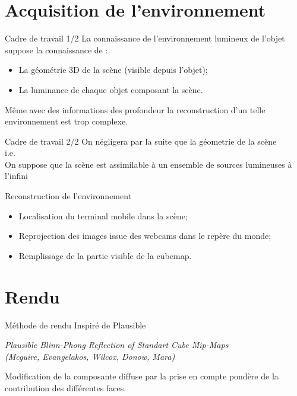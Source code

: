 \documentclass{beamer}
\begin{document}
\section{Acquisition de l'environnement}
\begin{frame}{Cadre de travail 1/2}
	La connaissance de l'environnement lumineux de l'objet suppose la connaissance de :
	\begin{itemize}
		\item La géométrie 3D de la scène (visible depuis l'objet);
		\item La luminance de chaque objet composant la scène.
	\end{itemize}
	Même avec des informations des profondeur la reconstruction d'un telle environnement est trop complexe.		
\end{frame}
\begin{frame}{Cadre de travail 2/2}
	\centering
	On négligera par la suite que la géometrie de la scène\\[.5cm]
	i.e.\\[.5cm]
	On suppose que la scène est assimilable à un ensemble de sources lumineuses à l'infini
\end{frame}

\begin{frame}{Reconstruction de l'environnement}
	\\[.5cm]
	\visible<1->{Pour chaque frame :}
	\begin{itemize}[<+->]
		\item Localisation du terminal mobile dans la scène;
		\item Reprojection des images issue des webcams dans le repère du monde;
		\item Remplissage de la partie visible de la cubemap.
	\end{itemize}
\end{frame}

\section{Rendu}
\begin{frame}{Méthode de rendu}
	Inspiré de Plausible
	\begin{center}\emph{Plausible Blinn-Phong Reflection of Standart Cube Mip-Maps\\(Mcguire, Evangelakos, Wilcox, Donow, Mara)}\end{center}
	Modification de la composante diffuse par la prise en compte pondère de la contribution des différentes faces.
\end{frame}
\end{document}
